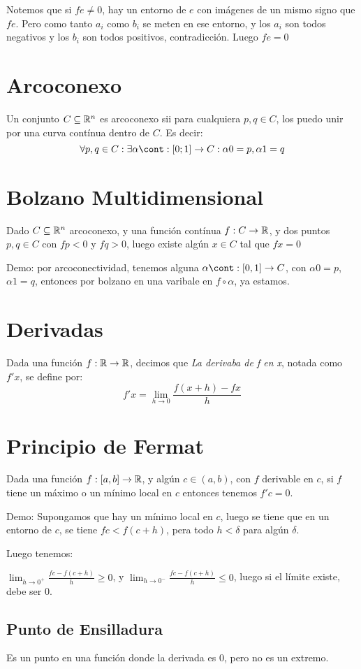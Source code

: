 \documentclass{article}
\begin{document}
	Notemos que si $fe \neq 0$, hay un entorno de $e$ con imágenes de un mismo
	signo que $fe$. Pero como tanto $a_i$ como $b_i$ se meten en ese entorno,
	y los $a_i$ son todos negativos y los $b_i$ son todos positivos,
	contradicción. Luego $fe = 0$

	\section{Arcoconexo}
	Un conjunto $C \subseteq \mathbb{R}^n$ es arcoconexo sii para cualquiera $p, q \in C$, 
	los puedo unir por una curva contínua dentro de $C$. Es decir: 
	\[\forall p, q \in C : \exists \alpha \cont
	: [0; 1] \to C : \alpha 0 = p, \alpha 1 = q\]
	\section{Bolzano Multidimensional}
		Dado $C \subseteq \mathbb{R}^n$ arcoconexo, y una función contínua $f : C \to \mathbb{R}$, y
		dos puntos $p, q \in C$ con $fp < 0$ y $fq > 0$, luego existe algún $x
		\in C$ tal que $fx = 0$

		Demo: por arcoconectividad, tenemos alguna $\alpha \cont : [0, 1] \to C$, con
		$\alpha 0 = p$, $\alpha 1 = q$, entonces por bolzano en una varibale en
		$f \circ \alpha$, ya estamos.

	\section{Derivadas}
	Dada una función $f : \mathbb{R} \to \mathbb{R}$, decimos que \emph{La derivaba de f en x},
	notada como $f'x$, se define por:
	\[f'x = \lim_{h \to 0} \frac{f(x+h) - fx}{h} \]

	\section{Principio de Fermat}
	Dada una función $f : [a, b] \to \mathbb{R}$, y algún $c \in (a, b)$, con $f$
	derivable en $c$, si $f$ tiene
	un máximo o un mínimo local en $c$ entonces tenemos
	$f'c = 0$.

	Demo: Supongamos que hay un mínimo local en $c$, luego se tiene que en un
	entorno de $c$, se tiene $fc < f(c+h)$, pera todo $h < \delta$ para algún
	$\delta$.

	Luego tenemos:

	$\lim_{h \to 0^+} \frac{fc - f(c+h)}{h} \geq 0$, y
	$\lim_{h \to 0^-} \frac{fc - f(c+h)}{h} \leq 0$, luego si el límite existe,
	debe ser $0$.

	\subsection{Punto de Ensilladura}
	Es un punto en una función donde la derivada es $0$, pero no es un extremo.
	
\end{document}
